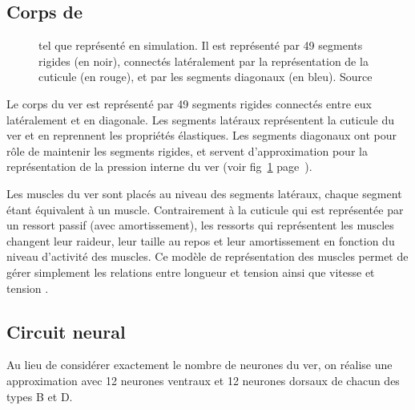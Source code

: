 \subsection{Corps de \celeg{}} %
\label{sub:Corps de celeg}

\begin{figure}[ht]
   \begin{center}
   \end{center}
   \caption[Représentation de \celeg{} en simulation]{\celeg{} tel que représenté en simulation. Il est représenté
   par 49 segments rigides (en noir), connectés latéralement par la représentation
   de la cuticule (en rouge), et par les segments diagonaux (en bleu). Source
   \cite{Boyle2009}}
   \label{fig:celegans_representation}
\end{figure}

Le corps du ver est représenté par 49 segments rigides connectés entre eux
latéralement et en diagonale. Les segments latéraux représentent la cuticule du
ver et en reprennent les propriétés élastiques. Les segments diagonaux ont pour
rôle de maintenir les segments rigides, et servent d'approximation pour la
représentation de la pression interne du ver (voir
fig~\ref{fig:celegans_representation}
page~\pageref{fig:celegans_representation}).

Les muscles du ver sont placés au niveau des segments latéraux, chaque segment
étant équivalent à un muscle. Contrairement à la cuticule qui est représentée par un
ressort passif (avec amortissement), les ressorts qui représentent les muscles
changent leur raideur, leur taille au repos et leur amortissement en fonction du niveau
d'activité des muscles. Ce modèle de représentation des muscles permet de gérer
simplement les relations entre longueur et tension ainsi que vitesse et tension
\cite{Boyle2009}.


\subsection{Circuit neural} %
\label{sub:Circuit neural}

Au lieu de considérer exactement le nombre de neurones du ver, on réalise une
approximation avec 12 neurones ventraux et 12 neurones dorsaux de chacun des types
B et D.

